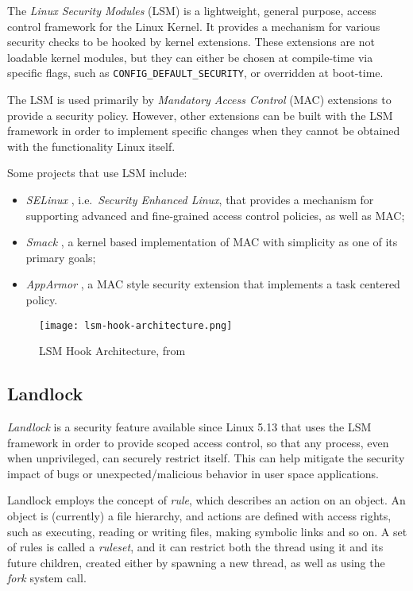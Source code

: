The \textit{Linux Security Modules} (LSM) \cite{lsm-2002, kernel-lsm}
is a lightweight, general purpose, access control framework for the Linux Kernel.
It provides a mechanism for various security checks to be hooked by kernel extensions.
These extensions are not loadable kernel modules, but they can either be chosen at
compile-time via specific flags, such as \texttt{CONFIG\_DEFAULT\_SECURITY}, or overridden at boot-time.

The LSM is used primarily by \textit{Mandatory Access Control} (MAC) extensions to
provide a security policy. However, other extensions can be built with the LSM framework
in order to implement specific changes when they cannot be obtained with the functionality Linux itself.

Some projects that use LSM include:
\begin{itemize}
  \item \textit{SELinux} \cite{selinux}, i.e.\ \textit{Security Enhanced Linux}, that provides a mechanism for supporting advanced and fine-grained access control policies, as well as MAC;
  \item \textit{Smack} \cite{smack}, a kernel based implementation of MAC with simplicity as one of its primary goals;
  \item \textit{AppArmor} \cite{apparmor}, a MAC style security extension that implements a task centered policy.
\end{itemize}

\begin{figure}[h]
  \centering
  \texttt{[image: lsm-hook-architecture.png]}
  \caption{LSM Hook Architecture, from \cite{kernel-lsm}}
  \label{fig:lsm-hook-architecture}
\end{figure}

\subsection{Landlock}
\textit{Landlock} \cite{landlock-kernel, landlock-user-space} is a security feature available since Linux 5.13
that uses the LSM framework in order to provide scoped access control,
so that any process, even when unprivileged, can securely restrict itself.
This can help mitigate the security impact of bugs or unexpected/malicious behavior
in user space applications.

Landlock employs the concept of \textit{rule}, which describes an action
on an object. An object is (currently) a file hierarchy, and actions are
defined with access rights, such as executing, reading or writing files, making
symbolic links and so on.
A set of rules is called a \textit{ruleset}, and it can restrict both the thread
using it and its future children, created either by spawning a new thread, as well
as using the \textit{fork} system call.

